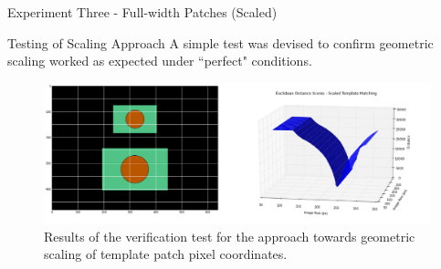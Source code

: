 \documentclass[10pt, compress]{beamer}
\begin{document}
%
% 
%	
%


\begin{frame}{Experiment Three - Full-width Patches (Scaled)}
	
	\vspace{-5pt}
  \begin{block}{Testing of Scaling Approach} A simple test was devised to confirm geometric scaling worked as expected under ``perfect" conditions.
 \vspace{-15pt}
  		  \begin{figure}[ht!]
\centering
\includegraphics[scale=0.23]{scaling_verif}
 \caption{Results of the verification test for the approach towards geometric scaling of template patch pixel coordinates.}
\end{figure}
  		
  \end{block}


\end{frame}
\end{document}
